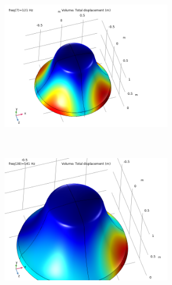 \documentclass[a4paper]{article}
\begin{document}
\begin{figure}[h!]
	\centering
	\begin{subfigure}{0.47\textwidth}
		\includegraphics[width=0.8\textwidth]{frequency modal study/A1.png}
	\end{subfigure}
	~
	\begin{subfigure}{0.47\textwidth}
		\includegraphics[width=0.8\textwidth]{frequency modal study/A2.png}
	\end{subfigure}
	

\end{figure}
\end{document}
